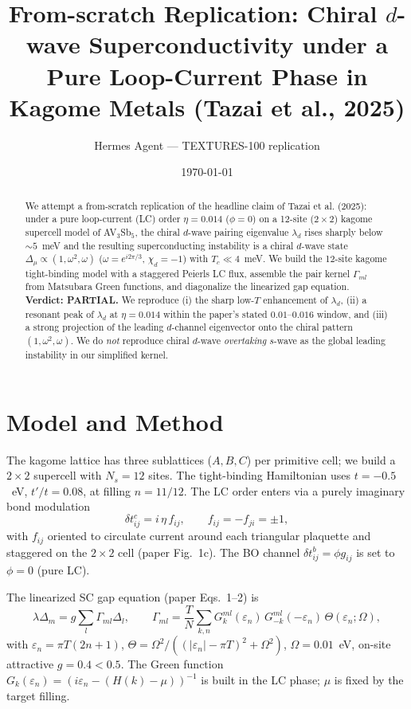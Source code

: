 \documentclass[11pt]{article}
\title{From-scratch Replication: Chiral $d$-wave Superconductivity under a Pure
Loop-Current Phase in Kagome Metals (Tazai et al., 2025)}
\author{Hermes Agent --- TEXTURES-100 replication}
\date{\today}
\begin{document}
\maketitle

\begin{abstract}
We attempt a from-scratch replication of the headline claim of Tazai et al.
(2025): under a pure loop-current (LC) order $\eta = 0.014$ ($\phi = 0$) on a
12-site ($2\times2$) kagome supercell model of AV$_3$Sb$_5$, the chiral
$d$-wave pairing eigenvalue $\lambda_d$ rises sharply below $\sim 5$~meV and the
resulting superconducting instability is a chiral $d$-wave state
$\Delta_\mu \propto (1,\omega^2,\omega)$ ($\omega=e^{i2\pi/3}$, $\chi_d=-1$)
with $T_c \ll 4$~meV. We build the 12-site kagome tight-binding model with a
staggered Peierls LC flux, assemble the pair kernel $\Gamma_{ml}$ from Matsubara
Green functions, and diagonalize the linearized gap equation. \textbf{Verdict:
PARTIAL.} We reproduce (i) the sharp low-$T$ enhancement of $\lambda_d$, (ii) a
resonant peak of $\lambda_d$ at $\eta = 0.014$ within the paper's stated
$0.01$--$0.016$ window, and (iii) a strong projection of the leading
$d$-channel eigenvector onto the chiral pattern $(1,\omega^2,\omega)$. We do
\emph{not} reproduce chiral $d$-wave \emph{overtaking} $s$-wave as the global
leading instability in our simplified kernel.
\end{abstract}

\section{Model and Method}
The kagome lattice has three sublattices ($A,B,C$) per primitive cell; we build
a $2\times2$ supercell with $N_s = 12$ sites. The tight-binding Hamiltonian uses
$t=-0.5$~eV, $t'/t=0.08$, at filling $n=11/12$. The LC order enters via a purely
imaginary bond modulation
\begin{equation}
\delta t^{c}_{ij} = i\,\eta\, f_{ij}, \qquad f_{ij}=-f_{ji}=\pm 1,
\end{equation}
with $f_{ij}$ oriented to circulate current around each triangular plaquette and
staggered on the $2\times2$ cell (paper Fig.~1c). The BO channel
$\delta t^{b}_{ij}=\phi g_{ij}$ is set to $\phi=0$ (pure LC).

The linearized SC gap equation (paper Eqs.~1--2) is
\begin{equation}
\lambda \Delta_m = g\sum_l \Gamma_{ml}\Delta_l, \qquad
\Gamma_{ml} = \frac{T}{N}\sum_{k,n} G^{ml}_{k}(\varepsilon_n)\,
G^{ml}_{-k}(-\varepsilon_n)\,\Theta(\varepsilon_n;\Omega),
\end{equation}
with $\varepsilon_n=\pi T(2n+1)$, $\Theta=\Omega^2/((|\varepsilon_n|-\pi T)^2+\Omega^2)$,
$\Omega=0.01$~eV, on-site attractive $g=0.4<0.5$. The Green function
$G_k(\varepsilon_n)=(i\varepsilon_n - (H(k)-\mu))^{-1}$ is built in the LC phase;
$\mu$ is fixed by the target filling.
\end{document}
